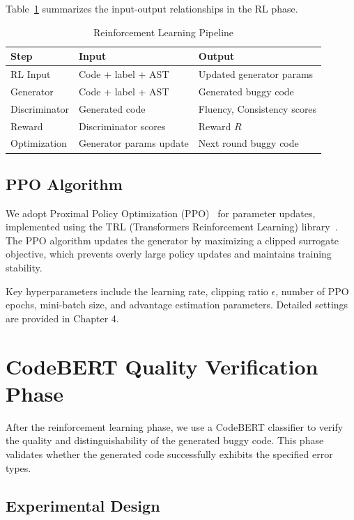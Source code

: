 Table~\ref{tab:rl_pipeline} summarizes the input-output relationships in the RL phase.

\begin{table}[h]
\centering
\caption{Reinforcement Learning Pipeline}
\label{tab:rl_pipeline}
\begin{tabular}{p{2.2cm} p{4cm} p{3.5cm}}
\toprule
\textbf{Step} & \textbf{Input} & \textbf{Output} \\
\midrule
RL Input & Code + label + AST & Updated generator params \\
Generator & Code + label + AST & Generated buggy code \\
Discriminator & Generated code & Fluency, Consistency scores \\
Reward & Discriminator scores & Reward $R$ \\
Optimization & Generator params update & Next round buggy code \\
\bottomrule
\end{tabular}
\end{table}

\subsection{PPO Algorithm}

We adopt Proximal Policy Optimization (PPO)~\cite{schulman2017proximalpolicyoptimizationalgorithms} for parameter updates, implemented using the TRL (Transformers Reinforcement Learning) library~\cite{vonwerra2022trl}. The PPO algorithm updates the generator by maximizing a clipped surrogate objective, which prevents overly large policy updates and maintains training stability.

Key hyperparameters include the learning rate, clipping ratio $\epsilon$, number of PPO epochs, mini-batch size, and advantage estimation parameters. Detailed settings are provided in Chapter 4.

\section{CodeBERT Quality Verification Phase}

After the reinforcement learning phase, we use a CodeBERT classifier to verify the quality and distinguishability of the generated buggy code. This phase validates whether the generated code successfully exhibits the specified error types.

\subsection{Experimental Design}

